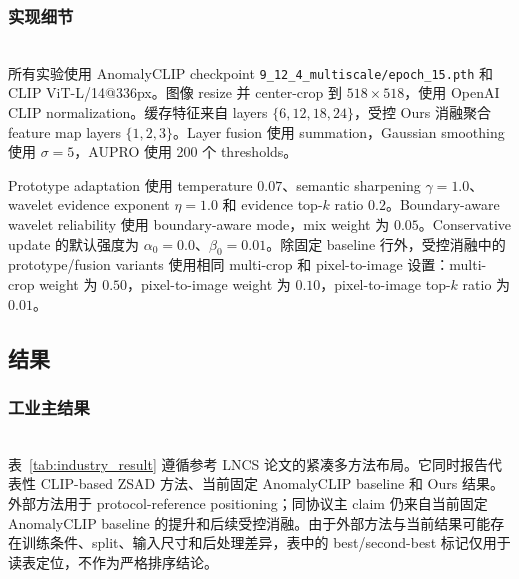 \documentclass[runningheads]{llncs}
\begin{document}
\subsubsection{实现细节}
\mbox{}\\
\noindent
所有实验使用 AnomalyCLIP checkpoint \texttt{9\_12\_4\_multiscale/epoch\_15.pth} 和 CLIP ViT-L/14@336px。图像 resize 并 center-crop 到 $518\times518$，使用 OpenAI CLIP normalization。缓存特征来自 layers $\{6,12,18,24\}$，受控 Ours 消融聚合 feature map layers $\{1,2,3\}$。Layer fusion 使用 summation，Gaussian smoothing 使用 $\sigma=5$，AUPRO 使用 200 个 thresholds。

Prototype adaptation 使用 temperature $0.07$、semantic sharpening $\gamma=1.0$、wavelet evidence exponent $\eta=1.0$ 和 evidence top-$k$ ratio $0.2$。Boundary-aware wavelet reliability 使用 boundary-aware mode，mix weight 为 $0.05$。Conservative update 的默认强度为 $\alpha_0=0.0$、$\beta_0=0.01$。除固定 baseline 行外，受控消融中的 prototype/fusion variants 使用相同 multi-crop 和 pixel-to-image 设置：multi-crop weight 为 $0.50$，pixel-to-image weight 为 $0.10$，pixel-to-image top-$k$ ratio 为 $0.01$。

\subsection{结果}

\subsubsection{工业主结果}
\mbox{}\\
\noindent
表~\ref{tab:industry_result} 遵循参考 LNCS 论文的紧凑多方法布局。它同时报告代表性 CLIP-based ZSAD 方法、当前固定 AnomalyCLIP baseline 和 Ours 结果。外部方法用于 protocol-reference positioning；同协议主 claim 仍来自当前固定 AnomalyCLIP baseline 的提升和后续受控消融。由于外部方法与当前结果可能存在训练条件、split、输入尺寸和后处理差异，表中的 best/second-best 标记仅用于读表定位，不作为严格排序结论。
\end{document}
